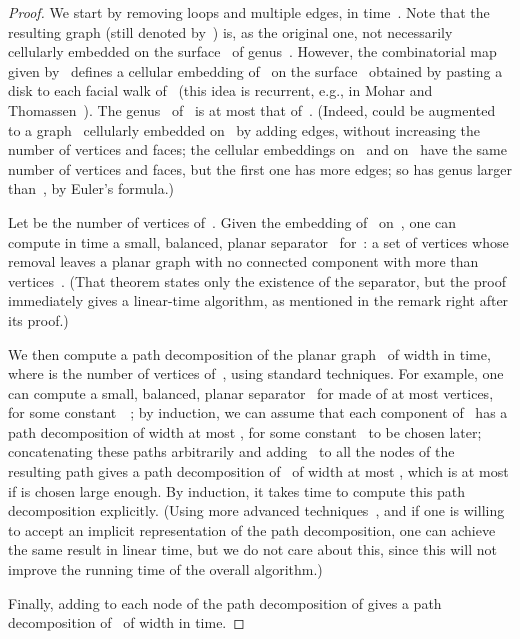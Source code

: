 \documentclass[11pt]{article}
\theoremstyle{plain}  \newtheorem{theorem}{Theorem}[section]
\theoremstyle{definition}
\begin{document}
\begin{proof}
  We start by removing loops and multiple edges, in time~.  Note that
  the resulting graph (still denoted by~) is, as the original one, not
  necessarily cellularly embedded on the surface~ of genus~.
  However, the combinatorial map given by~ defines a cellular embedding
  of~ on the surface~ obtained by pasting a disk to each facial
  walk of~ (this idea is recurrent, e.g., in Mohar and
  Thomassen~\cite{mt-gs-01}).  The genus~ of~ is at most that
  of~.  (Indeed,  could be augmented to a graph~ cellularly
  embedded on~ by adding edges, without increasing the number of
  vertices and faces; the cellular embeddings  on~ and  on~
  have the same number of vertices and faces, but the first one has more
  edges; so  has genus larger than~, by Euler's formula.)

  Let  be the number of vertices of~.  Given the embedding of~
  on~, one can compute in  time a small, balanced, planar
  separator~ for~: a set of  vertices whose removal
  leaves a planar graph with no connected component with more than 
  vertices~\cite[Theorem~5.1]{e-dgteg-03}.  (That theorem states only the
  existence of the separator, but the proof immediately gives a linear-time
  algorithm, as mentioned in the remark right after its proof.)

  We then compute a path decomposition of the planar graph~ of
  width  in  time, where  is the number
  of vertices of~, using standard techniques.  For example, one can
  compute a small, balanced, planar separator~ for  made of at most
   vertices, for some constant~~\cite{lt-stpg-79}; by
  induction, we can assume that each component of~ has a path
  decomposition of width at most , for some constant~ to be
  chosen later; concatenating these paths arbitrarily and adding~ to all
  the nodes of the resulting path gives a path decomposition of~ of
  width at most , which is at most  if 
  is chosen large enough.  By induction, it takes 
  time to compute this path decomposition explicitly.  (Using more advanced
  techniques~\cite{g-psppt-95}, and if one is willing to accept an implicit
  representation of the path decomposition, one can achieve the same result
  in linear time, but we do not care about this, since this will not
  improve the running time of the overall algorithm.)

  Finally, adding  to each node of the path decomposition of 
  gives a path decomposition of~ of width  in  time.
\end{proof}
\end{document}
